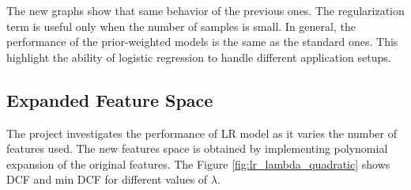 \documentclass{article}
\begin{document}
The new graphs show that same behavior of the previous ones. The regularization term is useful only when the number of samples is small. In general, the performance of the prior-weighted models is the same as the standard ones. This highlight the ability of logistic regression to handle different application setups.

\subsection{Expanded Feature Space}
The project investigates the performance of LR model as it varies the number of features used. The new features space is obtained by implementing polynomial expansion of the original features. The Figure \ref{fig:lr_lambda_quadratic} shows DCF and min DCF for different values of $\lambda$.
\end{document}
